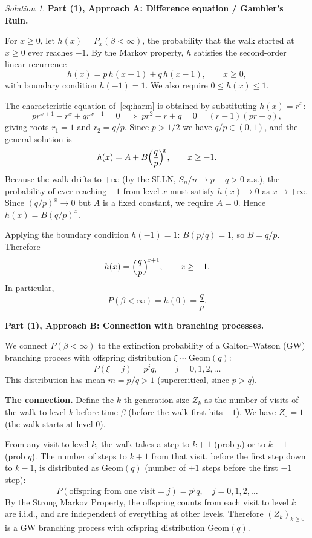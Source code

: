 \documentclass[12pt]{article}
\theoremstyle{remark}
\newtheorem*{solution}{Solution}
\newcommand{\1}{\mathbf{1}}
\begin{document}
\begin{solution}

\medskip\noindent\textbf{Part (1), Approach A: Difference equation / Gambler's Ruin.}

For $x \ge 0$, let $h(x) = P_x(\beta < \infty)$, the probability that the walk started
at $x \ge 0$ ever reaches $-1$.  By the Markov property, $h$ satisfies the
second-order linear recurrence
\begin{equation}\label{eq:harm}
  h(x) = p\,h(x+1) + q\,h(x-1), \qquad x \ge 0,
\end{equation}
with boundary condition $h(-1) = 1$.  We also require $0 \le h(x) \le 1$.

The characteristic equation of~\eqref{eq:harm} is obtained by substituting $h(x) = r^x$:
\[
  pr^{x+1} - r^x + qr^{x-1} = 0
  \;\implies\;
  pr^2 - r + q = 0
  = (r - 1)(pr - q),
\]
giving roots $r_1 = 1$ and $r_2 = q/p$.  Since $p > 1/2$ we have $q/p \in (0,1)$, and
the general solution is
\[
  h(x) = A + B\Bigl(\frac{q}{p}\Bigr)^{\!x}, \qquad x \ge -1.
\]
Because the walk drifts to $+\infty$ (by the SLLN, $S_n/n \to p - q > 0$ a.s.),
the probability of ever reaching $-1$ from level $x$ must satisfy $h(x) \to 0$ as
$x \to +\infty$.  Since $(q/p)^x \to 0$ but $A$ is a fixed constant, we require $A = 0$.
Hence $h(x) = B(q/p)^x$.

Applying the boundary condition $h(-1) = 1$:
$B(p/q) = 1$, so $B = q/p$.  Therefore
\[
  h(x) = \Bigl(\frac{q}{p}\Bigr)^{\!x+1}, \qquad x \ge -1.
\]
In particular,
\[
  \boxed{P(\beta < \infty) = h(0) = \frac{q}{p}.}
\]

\medskip\noindent\textbf{Part (1), Approach B: Connection with branching processes.}

We connect $P(\beta < \infty)$ to the extinction probability of a
Galton--Watson (GW) branching process with offspring distribution
$\xi \sim \mathrm{Geom}(q)$:
\[
  P(\xi = j) = p^j q, \qquad j = 0, 1, 2, \ldots
\]
This distribution has mean $m = p/q > 1$ (supercritical, since $p > q$).

\textbf{The connection.}
Define the $k$-th generation size $Z_k$ as the number of visits of the walk to level $k$
before time $\beta$ (before the walk first hits $-1$).  We have $Z_0 = 1$ (the walk
starts at level $0$).

From any visit to level $k$, the walk takes a step to $k+1$ (prob $p$) or to $k-1$
(prob $q$).  The number of steps to $k+1$ from that visit, before the first step
down to $k-1$, is distributed as $\mathrm{Geom}(q)$ (number of $+1$ steps before the
first $-1$ step):
\[
  P(\text{offspring from one visit} = j) = p^j q, \quad j = 0, 1, 2, \ldots
\]
By the Strong Markov Property, the offspring counts from each visit to level $k$
are i.i.d., and are independent of everything at other levels.  Therefore
$(Z_k)_{k \ge 0}$ is a GW branching process with offspring distribution $\mathrm{Geom}(q)$.


\end{solution}
\end{document}
